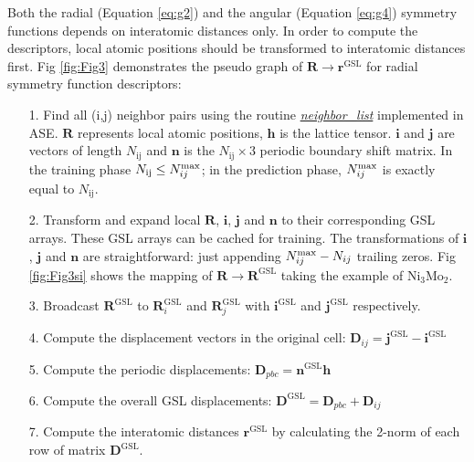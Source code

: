 \documentclass[preprint]{revtex4-2}
\begin{document}
Both the radial (Equation \ref{eq:g2}) and the angular (Equation \ref{eq:g4}) 
symmetry functions depends on interatomic distances only. In order to compute 
the descriptors, local atomic positions should be transformed to interatomic 
distances first. Fig \ref{fig:Fig3} demonstrates the pseudo graph of 
$\mathbf{R} \rightarrow \mathbf{r}^{\mathrm{GSL}}$ for radial symmetry function
descriptors: 

\begin{itemize}
    
    \item[1.] 
    Find all (i,j) neighbor pairs using the routine 
    \href{https://wiki.fysik.dtu.dk/ase/ase/neighborlist.html}
    {\textit{neighbor\_list}} implemented in ASE\cite{ase}. $\mathbf{R}$ 
    represents local atomic positions, $\mathbf{h}$ is the lattice tensor. 
    $\mathbf{i}$ and $\mathbf{j}$ are vectors of length $N_{\mathrm{ij}}$ and
    $\mathbf{n}$ is the $N_{\mathrm{ij}} \times 3$ periodic boundary shift 
    matrix. In the training phase $N_{\mathrm{ij}} \le N_{ij}^{\mathrm{max}}$; in the 
    prediction phase, $N_{ij}^{\mathrm{max}}$ is exactly equal to $N_{\mathrm{ij}}$.
    
    \item[2.] 
    Transform and expand local $\mathbf{R}$, $\mathbf{i}$, $\mathbf{j}$ and 
    $\mathbf{n}$ to their corresponding GSL arrays. These GSL arrays can be 
    cached for training. The transformations of $\mathbf{i}$, $\mathbf{j}$ and 
    $\mathbf{n}$ are straightforward: just appending $N_{ij}^{\mathrm{max}} - N_{ij}$ trailing 
    zeros. Fig \ref{fig:Fig3si} shows the mapping of 
    $\mathbf{R} \rightarrow \mathbf{R}^{\mathrm{GSL}}$ taking the example of 
    Ni$_3$Mo$_2$.

    \item[3.] 
    Broadcast $\mathbf{R}^{\mathrm{GSL}}$ to $\mathbf{R}_{i}^{\mathrm{GSL}}$ and
    $\mathbf{R}_{j}^{\mathrm{GSL}}$ with $\mathbf{i}^{\mathrm{GSL}}$ and 
    $\mathbf{j}^{\mathrm{GSL}}$ respectively.

    \item[4.]
    Compute the displacement vectors in the original cell:
    $\mathbf{D}_{ij} = \mathbf{j}^{\mathrm{GSL}} - \mathbf{i}^{\mathrm{GSL}}$
    
    \item[5.]
    Compute the periodic displacements:
    $\mathbf{D}_{pbc} = \mathbf{n}^{\mathrm{GSL}} \mathbf{h}$
    
    \item[6.]
    Compute the overall GSL displacements:
    $\mathbf{D}^{\mathrm{GSL}} = \mathbf{D}_{pbc} + \mathbf{D}_{ij}$
    
    \item[7.] 
    Compute the interatomic distances $\mathbf{r}^{\mathrm{GSL}}$ by calculating
    the 2-norm of each row of matrix $\mathbf{D}^{\mathrm{GSL}}$.

\end{itemize}
\end{document}
